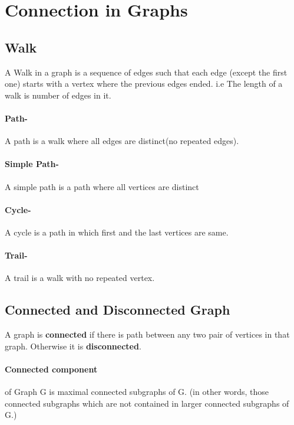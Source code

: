 \graphicspath{ {./2/} }

\section{Connection in Graphs}

\subsection{Walk}
A Walk in a graph is a sequence of edges such that each
edge (except the first one) starts with a vertex where
the previous edges ended. i.e The length of a walk is number of edges in it.

\paragraph{Path-}A path is a walk where all edges are distinct(no repeated edges).

\paragraph{Simple Path-}A simple path is a path where all vertices are distinct

\paragraph{Cycle-}A cycle is a path in which first and the last vertices are
same.

\paragraph{Trail-}A trail is a walk with no repeated vertex.


\subsection{Connected and Disconnected Graph}
A graph is \textbf{connected} if there is path between any two
pair of vertices in that graph. Otherwise it is
\textbf{disconnected}.


\paragraph{Connected component} of Graph G is maximal connected
subgraphs of G. (in other words, those connected
subgraphs which are not contained in larger connected
subgraphs of G.)


